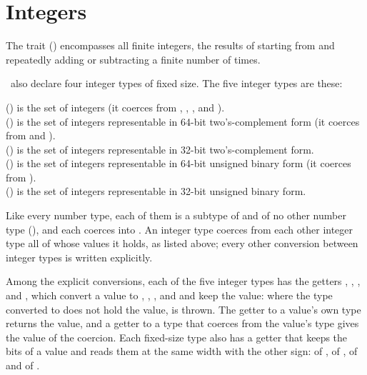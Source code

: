 %
%
%
%

\newpage
\section{Integers}

The trait  () encompasses all finite integers,
the results of starting from  and repeatedly adding or subtracting  a finite number of times.

\Library\ also declare four integer types of fixed size.
The five integer types are these:

\begin{tabbing}
 () is the set of integers (it coerces from , , , and ).
\\
 () is the set of integers representable in 64-bit two's-complement form (it coerces from  and ).
\\
 () is the set of integers representable in 32-bit two's-complement form.
\\
 () is the set of integers representable in 64-bit unsigned binary form (it coerces from ).
\\
 () is the set of integers representable in 32-bit unsigned binary form.
\end{tabbing}

Like every number type, each of them is a subtype of  and of no other
number type (), and each coerces into .
An integer type coerces from each other integer type all of whose values it holds,
as listed above; every other conversion between integer types is written explicitly.

Among the explicit conversions, each of the five integer types has the getters
, , ,  and , which
convert a value to , , ,
 and  and keep the value: where the type
converted to does not hold the value,  is thrown.
The getter to a value's own type returns the value, and a getter to a type that
coerces from the value's type gives the value of the coercion.
Each fixed-size type also has a getter that keeps the bits of a value and reads
them at the same width with the other sign:  of
,  of ,  of
 and  of .

